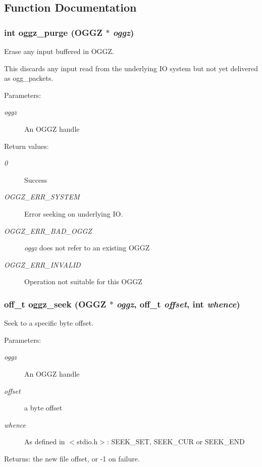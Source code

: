 \subsection{Function Documentation}
\subsubsection{\setlength{\rightskip}{0pt plus 5cm}int oggz\_\-purge ({\bf OGGZ} $\ast$ {\em oggz})}\label{group__seek__api_ga5}


Erase any input buffered in OGGZ. 

This discards any input read from the underlying IO system but not yet delivered as ogg\_\-packets.

\begin{Desc}
\item[Parameters:]
\begin{description}
\item[{\em oggz}]An OGGZ handle \end{description}
\end{Desc}
\begin{Desc}
\item[Return values:]
\begin{description}
\item[{\em 0}]Success \item[{\em OGGZ\_\-ERR\_\-SYSTEM}]Error seeking on underlying IO. \item[{\em OGGZ\_\-ERR\_\-BAD\_\-OGGZ}]{\em oggz\/} does not refer to an existing OGGZ \item[{\em OGGZ\_\-ERR\_\-INVALID}]Operation not suitable for this OGGZ \end{description}
\end{Desc}
\subsubsection{\setlength{\rightskip}{0pt plus 5cm}off\_\-t oggz\_\-seek ({\bf OGGZ} $\ast$ {\em oggz}, off\_\-t {\em offset}, int {\em whence})}\label{group__seek__api_ga8}


Seek to a specific byte offset. 

\begin{Desc}
\item[Parameters:]
\begin{description}
\item[{\em oggz}]An OGGZ handle \item[{\em offset}]a byte offset \item[{\em whence}]As defined in $<$stdio.h$>$: SEEK\_\-SET, SEEK\_\-CUR or SEEK\_\-END \end{description}
\end{Desc}
\begin{Desc}
\item[Returns:]the new file offset, or -1 on failure. \end{Desc}
